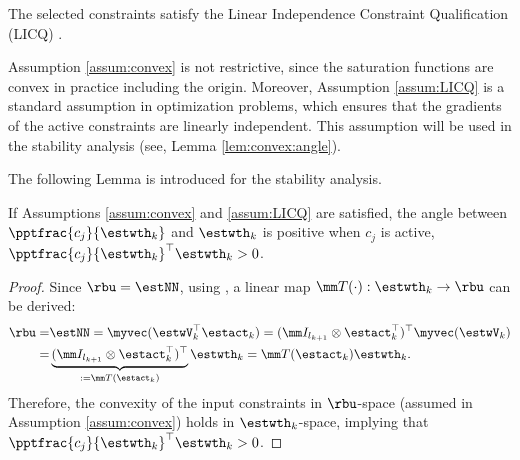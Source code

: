 \documentclass[lettersize,journal]{IEEEtran}
\begin{document}
\begin{assum}
    The selected constraints satisfy the Linear Independence Constraint Qualification (LICQ) \cite[Chap.~12 Def.~12.1]{Nocedal:2006aa}.
    \label{assum:LICQ}
\end{assum}

\begin{remark}
    Assumption \ref{assum:convex} is not restrictive, since the saturation functions are convex in practice including the origin.
    Moreover, Assumption \ref{assum:LICQ} is a standard assumption in optimization problems, which ensures that the gradients of the active constraints are linearly independent.
    This assumption will be used in the stability analysis (see, Lemma \ref{lem:convex:angle}).
\end{remark}

The following Lemma is introduced for the stability analysis.
\begin{lem}
    If Assumptions \ref{assum:convex} and \ref{assum:LICQ} are satisfied, the angle between $\pptfrac{c_j}{\estwth_k}$ and $\estwth_k$ is positive when $c_j$ is active, \ie $\pptfrac{c_j}{\estwth_k}^\top\estwth_k>0$.
    \label{lem:convex:angle}
\end{lem}

\begin{proof}

Since $\rbu = \estNN$, using \cite[Proposition 7.1.9]{Bernstein:2009aa}, a linear map $\mm T(\cdot):\estwth_k\to\rbu$ can be derived: 
\begin{equation}\label{eq:linear:map}
    \begin{aligned}
    \rbu 
    = 
    &
    \estNN 
    =
    \myvec(
        \estwV_k^\top \estact_k
    ) 
    = 
    (
        \mm I_{l_{k+1}}
        \otimes 
        \estact_k^\top
    )^\top
    \myvec(\estwV_k)
    \\
    = &
    \underbrace{
        (
        \mm I_{l_{k+1}}
        \otimes 
        \estact_k^\top
    )^\top}_{:=\mm T(\estact_k)}
    \estwth_k 
    =
    \mm T(\estact_k) \estwth_k.
    \end{aligned}
\end{equation}
Therefore, the convexity of the input constraints in $\rbu$-space (assumed in Assumption \ref{assum:convex}) holds in $\estwth_k$-space, implying
that $\pptfrac{c_j}{\estwth_k}^\top\estwth_k>0$.

\end{proof}
\end{document}
